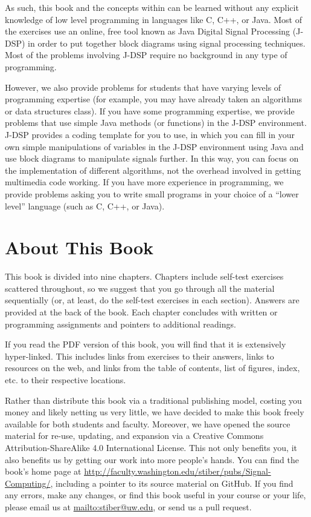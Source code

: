 As such, this book and the concepts within can be learned without any
explicit knowledge of low level programming in languages like C, C++,
or Java. Most of the exercises use an online, free tool known as Java
Digital Signal Processing (J-DSP) in order to put together block
diagrams using signal processing techniques.  Most of the problems
involving J-DSP require no background in any type of programming.

However, we also provide problems for students that have varying
levels of programming expertise (for example, you may have already
taken an algorithms or data structures class). If you have some
programming expertise, we provide problems that use simple Java
methods (or functions) in the J-DSP environment.  J-DSP provides a
coding template for you to use, in which you can fill in your own
simple manipulations of variables in the J-DSP environment using Java
and use block diagrams to manipulate signals further.  In this way,
you can focus on the implementation of different algorithms, not the
overhead involved in getting multimedia code working.  If you have
more experience in programming, we provide problems asking you to
write small programs in your choice of a ``lower level'' language
(such as C, C++, or Java).

\section*{About This Book}

This book is divided into nine chapters. Chapters include self-test
exercises scattered throughout, so we suggest that you go through all
the material sequentially (or, at least, do the self-test exercises in
each section). Answers are provided at the back of the book. Each
chapter concludes with written or programming assignments and pointers
to additional readings.

 If you read the PDF version of this book, you will find
that it is extensively hyper-linked.  This includes links from
exercises to their answers, links to resources on the web, and links
from the table of contents, list of figures, index, etc. to their
respective locations.

Rather than distribute this book via a traditional publishing model,
costing you money and likely netting us very little, we have decided
to make this book freely available for both students and
faculty. Moreover, we have opened the source material for re-use,
updating, and expansion via a Creative Commons Attribution-ShareAlike
4.0 International License. This not only benefits you, it also
benefits us by getting our work into more people's hands.  You can
find the book's home page at
\url{http://faculty.washington.edu/stiber/pubs/Signal-Computing/},
including a pointer to its source material on GitHub. If you find any
errors, make any changes, or find this book useful in your course or
your life, please email us at \url{mailto:stiber@uw.edu}, or send us a
pull request.

